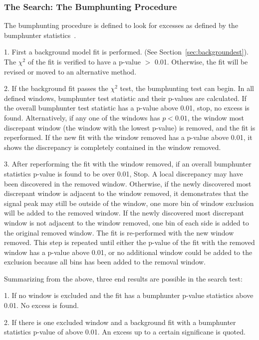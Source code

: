    \subsubsection{The Search: The Bumphunting Procedure}
    The bumphunting procedure is defined to look for excesses as defined by the bumphunter statistics~\cite{Pachal:2063032}.

    1.  First a background model fit is performed. (See Section~\ref{sec:backgroundest}). The $\chi^{2}$ of the fit is verified to have a p-value $>$ 0.01. Otherwise, the fit will be revised or moved to an alternative method.

    2.  If the background fit passes the $\chi^{2}$ test, the bumphunting test can begin. In all defined windows, bumphunter test statistic and their p-values are calculated. If the overall bumphunter test statistic has a p-value above 0.01, stop, no excess is found. Alternatively, if any one of the windows has  $p< 0.01$, the window most discrepant window (the window with the lowest p-value) is removed, and the fit is reperformed. If the new fit with the window removed has a p-value above 0.01, it shows the discrepancy is completely contained in the window removed.

    3. After reperforming the fit with the window removed, if an overall bumphunter statistics p-value is found to be over 0.01, Stop. A local discrepancy may have been discovered in the removed window. Otherwise, if the newly discovered most discrepant window is adjacent to the window removed, it demonstrates that the signal peak may still be outside of the window, one more bin of window exclusion will be added to the removed window. If the newly discovered most discrepant window is not adjacent to the window removed, one bin of each side is added to the original removed window. The fit is re-performed with the new window removed. This step is repeated until either the p-value of the fit with the removed window has a p-value above 0.01, or no additional window could be added to the exclusion because all bins has been added to the removal window.

    Summarizing from the above, three end results are possible in the search test:

    1. If no window is excluded and the fit has a bumphunter p-value statistics above 0.01. No excess is found. 

    2. If there is one excluded window and a background fit with a bumphunter statistics p-value of above 0.01. An excess up to a certain significane is quoted.

